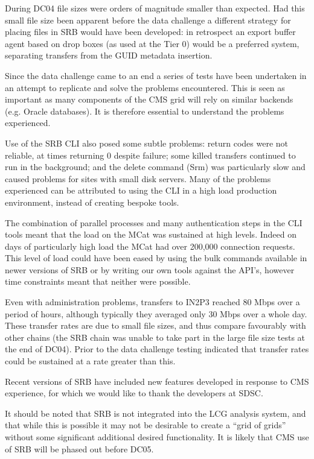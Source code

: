 \documentclass{cmspaper}
\begin{document}
During DC04 file sizes were orders of magnitude smaller than expected. Had this small file size been apparent before the data challenge a different strategy for placing files in SRB would have been developed: in retrospect an export buffer agent based on drop boxes (as used at the Tier 0) would be a preferred system, separating transfers from the GUID metadata insertion.  

Since the data challenge came to an end a series of tests have been undertaken in an attempt to replicate and solve the problems encountered. This is seen as important as many components of the CMS grid will rely on similar backends (e.g. Oracle databases). It is therefore essential to understand the problems experienced.

Use of the SRB CLI also posed some subtle problems: return codes were not reliable, at times returning 0 despite failure; some killed transfers continued to run in the background; and the delete command (Srm) was particularly slow and caused problems for sites with small disk servers. Many of the problems experienced can be attributed to using the CLI in a high load production environment, instead of creating bespoke tools. 

The combination of parallel processes and many authentication steps in the CLI tools meant that the load on the MCat was sustained at high levels. Indeed on days of particularly high load the MCat had over 200,000 connection requests. This level of load could have been eased by using the bulk commands available in newer versions of SRB or by writing our own tools against the API's, however time constraints meant that neither were possible.

Even with administration problems, transfers to IN2P3 reached 80 Mbps over a period of hours, although typically they averaged only 30 Mbps over a whole day. These transfer rates are due to small file sizes, and thus compare favourably with other chains (the SRB chain was unable to take part in the large file size tests at the end of DC04). Prior to the data challenge testing indicated that transfer rates could be sustained at a rate greater than this.

Recent versions of SRB have included new features developed in response to CMS experience, for which we would like to thank the developers at SDSC.

It should be noted that SRB is not integrated into the LCG analysis system, and that while this is possible \cite{gmcat} it may not be desirable to create a ``grid of grids'' without some significant additional desired functionality.  It is likely that CMS use of SRB will be phased out before DC05.
\end{document}
